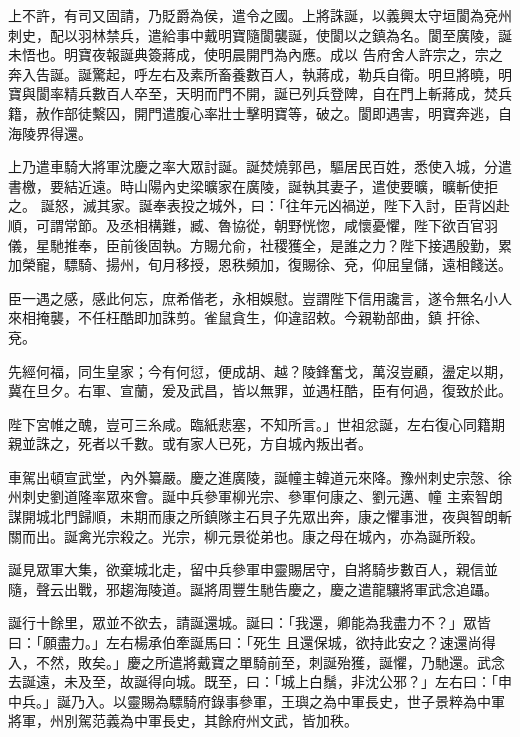 \begin{pinyinscope}
 上不許，有司又固請，乃貶爵為侯，遣令之國。上將誅誕，以義興太守垣閬為兗州刺史，配以羽林禁兵，遣給事中戴明寶隨閬襲誕，使閬以之鎮為名。閬至廣陵，誕未悟也。明寶夜報誕典簽蔣成，使明晨開門為內應。成以
 告府舍人許宗之，宗之奔入告誕。誕驚起，呼左右及素所畜養數百人，執蔣成，勒兵自衛。明旦將曉，明寶與閬率精兵數百人卒至，天明而門不開，誕已列兵登陴，自在門上斬蔣成，焚兵籍，赦作部徒繫囚，開門遣腹心率壯士擊明寶等，破之。閬即遇害，明寶奔逃，自海陵界得還。



 上乃遣車騎大將軍沈慶之率大眾討誕。誕焚燒郭邑，驅居民百姓，悉使入城，分遣書檄，要結近遠。時山陽內史梁曠家在廣陵，誕執其妻子，遣使要曠，曠斬使拒之。
 誕怒，滅其家。誕奉表投之城外，曰：「往年元凶禍逆，陛下入討，臣背凶赴順，可謂常節。及丞相構難，臧、魯協從，朝野恍惚，咸懷憂懼，陛下欲百官羽儀，星馳推奉，臣前後固執。方賜允俞，社稷獲全，是誰之力？陛下接遇殷勤，累加榮寵，驃騎、揚州，旬月移授，恩秩頻加，復賜徐、兗，仰屈皇儲，遠相餞送。



 臣一遇之感，感此何忘，庶希偕老，永相娛慰。豈謂陛下信用讒言，遂令無名小人來相掩襲，不任枉酷即加誅剪。雀鼠貪生，仰違詔敕。今親勒部曲，鎮
 扞徐、兗。



 先經何福，同生皇家；今有何愆，便成胡、越？陵鋒奮戈，萬沒豈顧，盪定以期，冀在旦夕。右軍、宣蘭，爰及武昌，皆以無罪，並遇枉酷，臣有何過，復致於此。



 陛下宮帷之醜，豈可三糸咸。臨紙悲塞，不知所言。」世祖忿誕，左右復心同籍期親並誅之，死者以千數。或有家人已死，方自城內叛出者。



 車駕出頓宣武堂，內外纂嚴。慶之進廣陵，誕幢主韓道元來降。豫州刺史宗愨、徐州刺史劉道隆率眾來會。誕中兵參軍柳光宗、參軍何康之、劉元邁、幢
 主索智朗謀開城北門歸順，未期而康之所鎮隊主石貝子先眾出奔，康之懼事泄，夜與智朗斬關而出。誕禽光宗殺之。光宗，柳元景從弟也。康之母在城內，亦為誕所殺。



 誕見眾軍大集，欲棄城北走，留中兵參軍申靈賜居守，自將騎步數百人，親信並隨，聲云出戰，邪趨海陵道。誕將周豐生馳告慶之，慶之遣龍驤將軍武念追躡。



 誕行十餘里，眾並不欲去，請誕還城。誕曰：「我還，卿能為我盡力不？」眾皆曰：「願盡力。」左右楊承伯牽誕馬曰：「死生
 且還保城，欲持此安之？速還尚得入，不然，敗矣。」慶之所遣將戴寶之單騎前至，刺誕殆獲，誕懼，乃馳還。武念去誕遠，未及至，故誕得向城。既至，曰：「城上白鬚，非沈公邪？」左右曰：「申中兵。」誕乃入。以靈賜為驃騎府錄事參軍，王璵之為中軍長史，世子景粹為中軍將軍，州別駕范義為中軍長史，其餘府州文武，皆加秩。




\end{pinyinscope}
